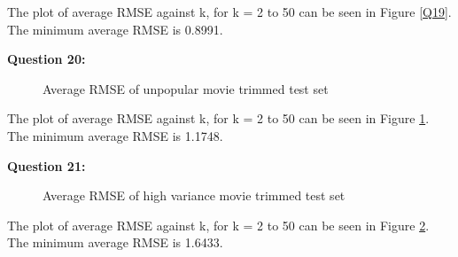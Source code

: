 \documentclass{article}
\begin{document}
The plot of average RMSE against k, for k = 2 to 50 can be seen in Figure \ref{Q19}. The minimum average RMSE is 0.8991.
\newline

\bigbreak \textbf{Question 20:}
\begin{figure}
\centering
{}
\caption{Average RMSE of unpopular movie trimmed test set} \label{Q20}
\end{figure}

The plot of average RMSE against k, for k = 2 to 50 can be seen in Figure \ref{Q20}. The minimum average RMSE is 1.1748.
\newline

\bigbreak \textbf{Question 21:}
\begin{figure}
\centering
{}
\caption{Average RMSE of high variance movie trimmed test set} \label{Q21}
\end{figure}

The plot of average RMSE against k, for k = 2 to 50 can be seen in Figure \ref{Q21}. The minimum average RMSE is 1.6433.
\newline
\end{document}
